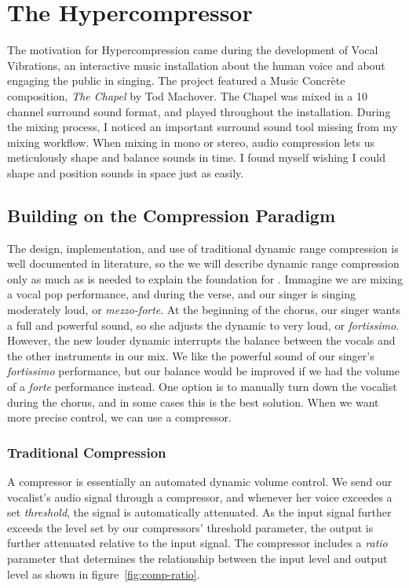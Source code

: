 \chapter{The Hypercompressor}
\label{ch:hypercompressor}

The motivation for Hypercompression came during the development of
Vocal Vibrations, an interactive music installation about the human
voice and about engaging the public in singing.\cite{Holbrow2014} The
project featured a Music Concr\`{e}te composition, \textit{The Chapel}
by Tod Machover. The Chapel was mixed in a 10 channel surround sound
format, and played throughout the installation. During the mixing
process, I noticed an important surround sound tool missing from my
mixing workflow. When mixing in mono or stereo, audio
compression lets us meticulously shape and balance sounds in
time. I found myself wishing I could shape and position sounds in
space just as easily.

\section{Building on the Compression Paradigm}
The design, implementation, and use of traditional dynamic range
compression is well documented in
literature,\cite[]{Giannoulis2012,Case2007,Deruty2014} so the we will
describe dynamic range compression only as much as is needed to
explain the foundation for \thesis. Immagine we are mixing a vocal pop
performance, and during the verse, and our singer is singing
moderately loud, or \textit{mezzo-forte}. At the beginning of the
chorus, our singer wants a full and powerful sound, so she adjusts the
dynamic to very loud, or \textit{fortissimo}. However, the new louder
dynamic interrupts the balance between the vocals and the other
instruments in our mix. We like the powerful sound of our singer's
\textit{fortissimo} performance, but our balance would be improved if
we had the volume of a \textit{forte} performance instead. One option
is to manually turn down the vocalist during the chorus, and in some
cases this is the best solution. When we want more precise control, we
can use a compressor.

\subsection{Traditional Compression}
\label{sec:trad-compr}
A compressor is essentially an automated dynamic volume control. We
send our vocalist's audio signal through a compressor, and whenever
her voice exceedes a set \textit{threshold}, the signal is
automatically attenuated. As the input signal further exceeds the
level set by our compressors' threshold parameter, the output is
further attenuated relative to the input signal. The compressor
includes a \textit{ratio} parameter that determines the relationship
between the input level and output level as shown in
figure~\ref{fig:comp-ratio}.

